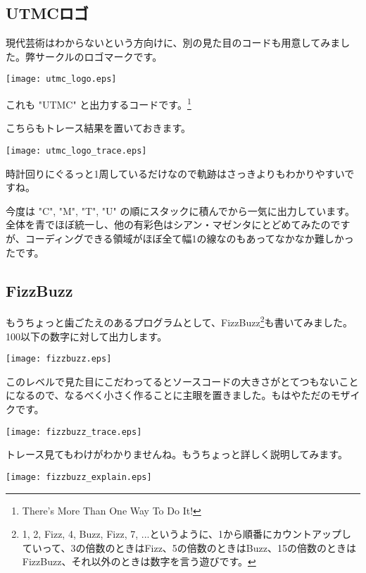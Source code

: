 \subsection{UTMCロゴ}
現代芸術はわからないという方向けに、別の見た目のコードも用意してみました。弊サークルのロゴマークです。

\begin{center}
	\texttt{[image: utmc\_logo.eps]}
\end{center}

これも "UTMC" と出力するコードです。\footnote{There's More Than One Way To Do It!}

こちらもトレース結果を置いておきます。

\begin{center}
	\texttt{[image: utmc\_logo\_trace.eps]}
\end{center}

時計回りにぐるっと1周しているだけなので軌跡はさっきよりもわかりやすいですね。

今度は "C", "M", "T", "U" の順にスタックに積んでから一気に出力しています。全体を青でほぼ統一し、他の有彩色はシアン・マゼンタにとどめてみたのですが、コーディングできる領域がほぼ全て幅1の線なのもあってなかなか難しかったです。

\subsection{FizzBuzz}
もうちょっと歯ごたえのあるプログラムとして、FizzBuzz\footnote{1, 2, Fizz, 4, Buzz, Fizz, 7, ...というように、1から順番にカウントアップしていって、3の倍数のときはFizz、5の倍数のときはBuzz、15の倍数のときはFizzBuzz、それ以外のときは数字を言う遊びです。}も書いてみました。100以下の数字に対して出力します。

\begin{center}
	\texttt{[image: fizzbuzz.eps]}
\end{center}

このレベルで見た目にこだわってるとソースコードの大きさがとてつもないことになるので、なるべく小さく作ることに主眼を置きました。もはやただのモザイクです。

\begin{center}
	\texttt{[image: fizzbuzz\_trace.eps]}
\end{center}

トレース見てもわけがわかりませんね。もうちょっと詳しく説明してみます。

\begin{center}
	\texttt{[image: fizzbuzz\_explain.eps]}
\end{center}

